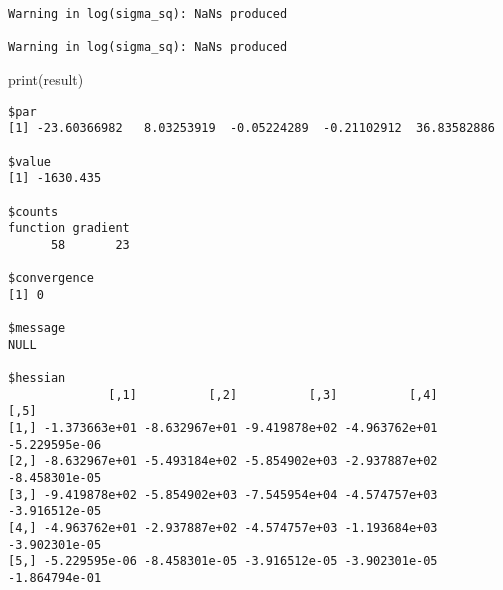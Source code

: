 \documentclass[
  letterpaper,
  DIV=11,
  numbers=noendperiod]{scrartcl}
\newenvironment{Shaded}{\begin{snugshade}}{\end{snugshade}}
\newcommand{\AttributeTok}[1]{\textcolor[rgb]{0.40,0.45,0.13}{#1}}
\newcommand{\CommentTok}[1]{\textcolor[rgb]{0.37,0.37,0.37}{#1}}
\newcommand{\ConstantTok}[1]{\textcolor[rgb]{0.56,0.35,0.01}{#1}}
\newcommand{\DecValTok}[1]{\textcolor[rgb]{0.68,0.00,0.00}{#1}}
\newcommand{\FunctionTok}[1]{\textcolor[rgb]{0.28,0.35,0.67}{#1}}
\newcommand{\NormalTok}[1]{\textcolor[rgb]{0.00,0.23,0.31}{#1}}
\newcommand{\OtherTok}[1]{\textcolor[rgb]{0.00,0.23,0.31}{#1}}
\newcommand{\SpecialCharTok}[1]{\textcolor[rgb]{0.37,0.37,0.37}{#1}}
\newcommand{\StringTok}[1]{\textcolor[rgb]{0.13,0.47,0.30}{#1}}
\begin{document}
\begin{Shaded}
\end{Shaded}

\begin{verbatim}
Warning in log(sigma_sq): NaNs produced

Warning in log(sigma_sq): NaNs produced
\end{verbatim}

\begin{Shaded}
\begin{Highlighting}[]
\FunctionTok{print}\NormalTok{(result) }
\end{Highlighting}
\end{Shaded}

\begin{verbatim}
$par
[1] -23.60366982   8.03253919  -0.05224289  -0.21102912  36.83582886

$value
[1] -1630.435

$counts
function gradient 
      58       23 

$convergence
[1] 0

$message
NULL

$hessian
              [,1]          [,2]          [,3]          [,4]          [,5]
[1,] -1.373663e+01 -8.632967e+01 -9.419878e+02 -4.963762e+01 -5.229595e-06
[2,] -8.632967e+01 -5.493184e+02 -5.854902e+03 -2.937887e+02 -8.458301e-05
[3,] -9.419878e+02 -5.854902e+03 -7.545954e+04 -4.574757e+03 -3.916512e-05
[4,] -4.963762e+01 -2.937887e+02 -4.574757e+03 -1.193684e+03 -3.902301e-05
[5,] -5.229595e-06 -8.458301e-05 -3.916512e-05 -3.902301e-05 -1.864794e-01
\end{verbatim}
\end{document}

